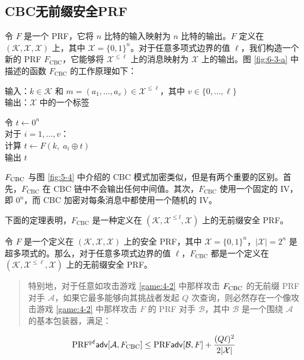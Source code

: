 \subsection{CBC无前缀安全PRF}

令 $F$ 是一个 PRF，它将 $n$ 比特的输入映射为 $n$ 比特的输出。$F$ 定义在 $(\mathcal{K},\mathcal{X},\mathcal{X})$ 上，其中 $\mathcal{X}=\{0,1\}^n$。对于任意多项式边界的值 $\ell$，我们构造一个新的 PRF $F_\mathrm{CBC}$，它能够将 $\mathcal{X}^{\leq\ell}$ 上的消息映射为 $\mathcal{X}$ 上的输出。图 \ref{fig:6-3-a} 中描述的函数 $F_\mathrm{CBC}$ 的工作原理如下：

\vspace*{5pt}

\hspace*{5pt} 输入：$k\in\mathcal{K}$ 和 $m=(a_1,\dots,a_v)\in\mathcal{X}^{\leq\ell}$，其中 $v\in\{0,\dots,\ell\}$\\
\hspace*{26pt} 输出：$\mathcal{X}$ 中的一个标签

\vspace*{5pt}

\hspace*{5pt} 令 $t\leftarrow0^n$\\
\hspace*{26pt} 对于 $i=1,\dots,v$：\\
\hspace*{50pt} 计算 $t\leftarrow F(k,\;a_i\oplus t)$\\
\hspace*{26pt} 输出 $t$

\vspace*{5pt}

\noindent
$F_{\rm CBC}$ 与图 \ref{fig:5-4}	中介绍的 CBC 模式加密类似，但是有两个重要的区别。首先，$F_\mathrm{CBC}$ 在 CBC 链中不会输出任何中间值。其次，$F_\mathrm{CBC}$ 使用一个固定的 IV，即 $0^n$，而 CBC 加密对每条消息中都使用一个随机的 IV。

下面的定理表明，$F_\mathrm{CBC}$ 是一种定义在 $(\mathcal{K},\mathcal{X}^{\leq l},\mathcal{X})$ 上的无前缀安全 PRF。

\begin{theorem}\label{theo:6-3}
令 $F$ 是一个定义在 $(\mathcal{K},\mathcal{X},\mathcal{X})$ 上的安全 PRF，其中 $\mathcal{X}=\{0,1\}^n$，$|\mathcal{X}|=2^n$ 是超多项式的。那么，对于任意多项式边界的值 $\ell$，$F_\mathrm{CBC}$ 都是一个定义在 $(\mathcal{K},\mathcal{X}^{\leq\ell},\mathcal{X})$ 上的无前缀安全 PRF。
\begin{quote}
特别地，对于任意如攻击游戏 \ref{game:4-2} 中那样攻击 $F_{\rm CBC}$ 的无前缀 PRF 对手 $\mathcal{A}$，如果它最多能够向其挑战者发起 $Q$ 次查询，则必然存在一个像攻击游戏 \ref{game:4-2} 中那样攻击 $F$ 的 PRF 对手 $\mathcal{B}$，其中 $\mathcal{B}$ 是一个围绕 $\mathcal{A}$ 的基本包装器，满足：
\end{quote}
\begin{equation}\label{eq:6-7}
{\rm PRF^{pf}\mathsf{adv}}[\mathcal{A},F_{\rm CBC}]\leq{\rm PRF\mathsf{adv}}[\mathcal{B},F]+\frac{(Q\ell)^2}{2|\mathcal{X}|}
\end{equation}
\end{theorem}

